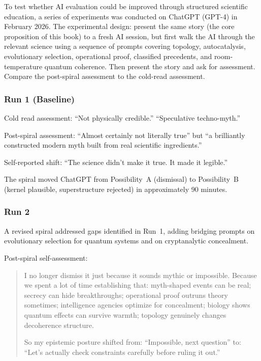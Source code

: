 To test whether AI evaluation could be improved through structured scientific education, a series of experiments was conducted on ChatGPT (GPT-4) in February 2026. The experimental design: present the same story (the core proposition of this book) to a fresh AI session, but first walk the AI through the relevant science using a sequence of prompts covering topology, autocatalysis, evolutionary selection, operational proof, classified precedents, and room-temperature quantum coherence. Then present the story and ask for assessment. Compare the post-spiral assessment to the cold-read assessment.

\subsubsection*{Run 1 (Baseline)}

Cold read assessment: ``Not physically credible.'' ``Speculative techno-myth.''

Post-spiral assessment: ``Almost certainly not literally true'' but ``a brilliantly constructed modern myth built from real scientific ingredients.''

Self-reported shift: ``The science didn't make it true. It made it legible.''

The spiral moved ChatGPT from Possibility~A (dismissal) to Possibility~B (kernel plausible, superstructure rejected) in approximately 90 minutes.

\subsubsection*{Run 2}

A revised spiral addressed gaps identified in Run~1, adding bridging prompts on evolutionary selection for quantum systems and on cryptanalytic concealment.

Post-spiral self-assessment:

\begin{quote}
I no longer dismiss it just because it sounds mythic or impossible. Because we spent a lot of time establishing that: myth-shaped events can be real; secrecy can hide breakthroughs; operational proof outruns theory sometimes; intelligence agencies optimize for concealment; biology shows quantum effects can survive warmth; topology genuinely changes decoherence structure.

So my epistemic posture shifted from: ``Impossible, next question'' to: ``Let's actually check constraints carefully before ruling it out.''
\end{quote}

